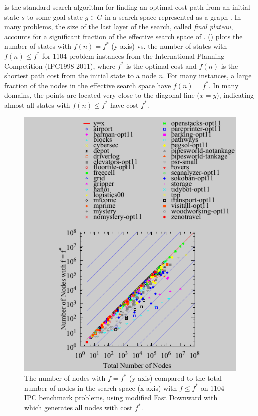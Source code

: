 \astar is the standard search
algorithm for finding an optimal-cost path from an initial state $s$ to
some goal state $g \in G$ in a search space represented as a graph
\cite{hart1968formal}.
In many problems, the size of the last layer of the search, called
\emph{final plateau}, accounts for a significant fraction of the
effective search space of \astar.  
() plots the number of states with $f(n) = f^*$
(y-axis) vs. the number of states with $f(n) \leq f^*$ for 1104 problem
instances from the International Planning Competition (IPC1998-2011),
where $f^*$ is the optimal cost and $f(n)$ is the shortest path cost
from the initial state to a node $n$.  For many instances, a large
fraction of the nodes in the effective search space have $f(n)=f^*$.
In many domains, the points are located very close to the diagonal line
($x=y$), indicating almost all states with $f(n) \leq f^*$ have cost
$f^*$.

\begin{figure}[htbp]
  \centering
  \includegraphics{tables/aaai16-frontier/aaai16prelim3/lmcut_frontier_noh-front.pdf}
 \caption{
 The number of nodes with $f=f^*$ (y-axis) compared to the
 total number of nodes in the search space (x-axis) with $f\leq f^*$ on 1104 IPC benchmark problems,
  using modified Fast Downward with \lmcut which 
  generates all nodes with cost $f^*$.
  }
 \label{fig:plateau-noh}
\end{figure}


